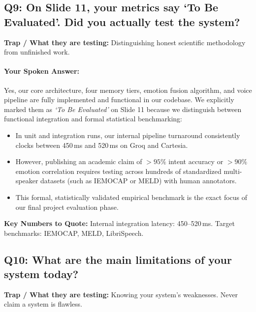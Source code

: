 \documentclass[11pt,a4paper]{article}
\begin{document}
\subsection*{Q9: On Slide 11, your metrics say `To Be Evaluated'. Did you actually test the system?}
\textbf{Trap / What they are testing:} Distinguishing honest scientific methodology from unfinished work.

\paragraph{Your Spoken Answer:}
Yes, our core architecture, four memory tiers, emotion fusion algorithm, and voice pipeline are fully implemented and functional in our codebase.
We explicitly marked them as \textit{`To Be Evaluated'} on Slide 11 because we distinguish between functional integration and formal statistical benchmarking:
\begin{itemize}
    \item In unit and integration runs, our internal pipeline turnaround consistently clocks between 450\,ms and 520\,ms on Groq and Cartesia.
    \item However, publishing an academic claim of $>95\%$ intent accuracy or $>90\%$ emotion correlation requires testing across hundreds of standardized multi-speaker datasets (such as IEMOCAP or MELD) with human annotators.
    \item This formal, statistically validated empirical benchmark is the exact focus of our final project evaluation phase.
\end{itemize}

\noindent\textbf{Key Numbers to Quote:} Internal integration latency: 450--520\,ms. Target benchmarks: IEMOCAP, MELD, LibriSpeech.

\vspace{1em}

\subsection*{Q10: What are the main limitations of your system today?}
\textbf{Trap / What they are testing:} Knowing your system's weaknesses. Never claim a system is flawless.
\end{document}
